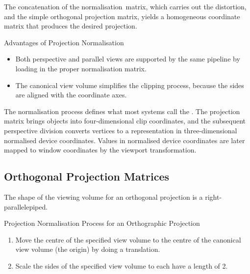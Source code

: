\documentclass[../COS3712_Notes.tex]{subfiles}
\begin{document}
        The concatenation of the normalisation~matrix, which carries out the distortion,
        and the simple orthogonal projection matrix, yields a homogeneous coordinate matrix
        that produces the desired projection.

        \begin{sidenote}{Advantages of Projection Normalisation}
          $ $\vspace{-1em}
          \begin{itemize}
            \item Both perspective and parallel views are supported by the same pipeline
              by loading in the proper normalisation matrix.
            \item The canonical view volume simplifies the clipping process,
              because the sides are aligned with the coordinate axes.
          \end{itemize}
        \end{sidenote}

        The normalisation process defines what most systems call the .
        The projection matrix brings objects into four-dimensional clip coordinates,
        and the subsequent perspective division converts vertices to a representation
        in three-dimensional normalised device coordinates.
        Values in normalised device coordinates are later mapped to window coordinates
        by the viewport transformation.

      \subsection{Orthogonal Projection Matrices}
        The shape of the viewing volume for an orthogonal projection is a right-parallelepiped.

        \begin{sidenote}{Projection Normalisation Process for an Orthographic Projection}
          $ $\vspace{-1em}
          \begin{enumerate}
            \item Move the centre of the specified view volume to the centre of the canonical
              view volume (the origin) by doing a translation.
            \item Scale the sides of the specified view volume to each have a length of 2.
          \end{enumerate}
        \end{sidenote}
\end{document}
